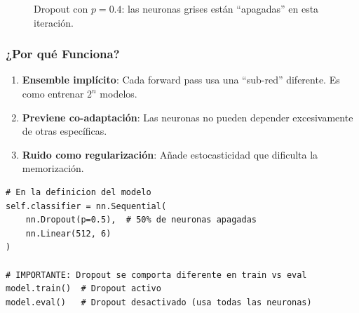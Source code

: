 \documentclass[12pt,a4paper]{article}
\begin{document}
\begin{figure}[H]
\centering
{}
\caption{Dropout con $p=0.4$: las neuronas grises están ``apagadas'' en esta iteración.}
\end{figure}

\subsubsection{¿Por qué Funciona?}

\begin{enumerate}
    \item \textbf{Ensemble implícito}: Cada forward pass usa una ``sub-red'' diferente. Es como entrenar $2^n$ modelos.
    \item \textbf{Previene co-adaptación}: Las neuronas no pueden depender excesivamente de otras específicas.
    \item \textbf{Ruido como regularización}: Añade estocasticidad que dificulta la memorización.
\end{enumerate}

\begin{lstlisting}[caption={Dropout en PyTorch}]
# En la definicion del modelo
self.classifier = nn.Sequential(
    nn.Dropout(p=0.5),  # 50% de neuronas apagadas
    nn.Linear(512, 6)
)

# IMPORTANTE: Dropout se comporta diferente en train vs eval
model.train()  # Dropout activo
model.eval()   # Dropout desactivado (usa todas las neuronas)
\end{lstlisting}
\end{document}
